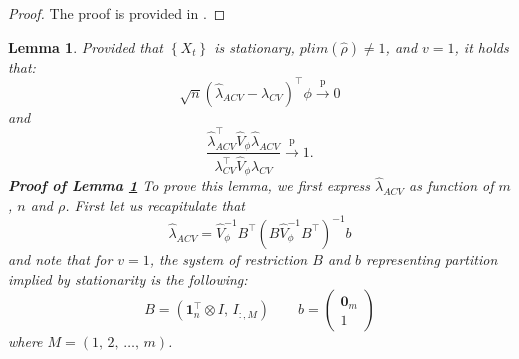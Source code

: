 \documentclass[11pt,dvipsnames]{article}
\newtheorem{proof}{Proof of Proposition}
\newtheorem{lemma}{Lemma}
\begin{document}
\begin{appendices}
\begin{proof}
The proof is provided in \citet[p. 1575]{giacominiTestsConditionalPredictive2006}.
\end{proof}



\begin{lemma}\label{lemm:AsymptoticEquivalence}
Provided that $ \left\lbrace X_{t} \right\rbrace  $ is stationary, $ plim(\hat{\rho})\neq 1 $, and $ v=1 $, it holds that:
\begin{equation}
\sqrt{n}(\widehat{\lambda}_{ACV}-\lambda_{CV})^{\top} \phi \overset{\mathrm{p}}{\longrightarrow} 0
\end{equation}
and
\begin{equation}
\frac{\widehat{\lambda}_{ACV}^{\top} \widehat{V}_{\phi} \widehat{\lambda}_{ACV}}{\lambda_{CV}^{\top} \widehat{V}_{\phi} \lambda_{CV}} \overset{\mathrm{p}}{\longrightarrow} 1.
\end{equation}
\textbf{\textup{Proof of Lemma \ref{lemm:AsymptoticEquivalence}}}
To prove this lemma, we first express $ \widehat{\lambda}_{ACV} $  as function of $ m $, $ n $ and $ \rho  $. First let us recapitulate that 
\begin{equation}
\widehat{\lambda}_{ACV}=\widehat{V}_{\phi}^{-1}B^{\top}\left( B \widehat{V}_{\phi}^{-1} B^{\top} \right)^{-1} b
\end{equation}
and note that for $ v=1 $, the system of restriction $ B $ and $ b $ representing partition implied by stationarity is the following:
\begin{equation}
B=\left(  \mathbf{1}_{n}^{\top}\otimes I,\,I_{:,M} \right) \qquad b=
\begin{pmatrix}
\mathbf{0}_{m}\\
1
\end{pmatrix}
\end{equation}
where $ M=\left(1,\,2,\,\ldots,\,m \right)  $.


\end{lemma}
\end{appendices}
\end{document}

